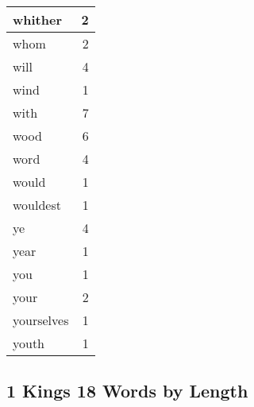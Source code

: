 \begin{center}
\begin{longtable}{l|r}
whither & 2\\ \hline 
whom & 2\\ \hline 
will & 4\\ \hline 
wind & 1\\ \hline 
with & 7\\ \hline 
wood & 6\\ \hline 
word & 4\\ \hline 
would & 1\\ \hline 
wouldest & 1\\ \hline 
ye & 4\\ \hline 
year & 1\\ \hline 
you & 1\\ \hline 
your & 2\\ \hline 
yourselves & 1\\ \hline 
youth & 1\\ \hline 
\end{longtable}
\end{center}





\subsection{1 Kings 18 Words by Length}


\normalsize
 
